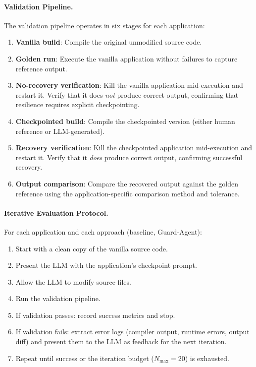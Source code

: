 \paragraph{Validation Pipeline.}

The validation pipeline operates in six stages for each application:

\begin{enumerate}
    \item \textbf{Vanilla build}: Compile the original unmodified source code.
    \item \textbf{Golden run}: Execute the vanilla application without failures to capture reference output.
    \item \textbf{No-recovery verification}: Kill the vanilla application mid-execution and restart it. Verify that it does \emph{not} produce correct output, confirming that resilience requires explicit checkpointing.
    \item \textbf{Checkpointed build}: Compile the checkpointed version (either human reference or LLM-generated).
    \item \textbf{Recovery verification}: Kill the checkpointed application mid-execution and restart it. Verify that it \emph{does} produce correct output, confirming successful recovery.
    \item \textbf{Output comparison}: Compare the recovered output against the golden reference using the application-specific comparison method and tolerance.
\end{enumerate}

\paragraph{Iterative Evaluation Protocol.}

For each application and each approach (baseline, Guard-Agent):

\begin{enumerate}
    \item Start with a clean copy of the vanilla source code.
    \item Present the LLM with the application's checkpoint prompt.
    \item Allow the LLM to modify source files.
    \item Run the validation pipeline.
    \item If validation passes: record success metrics and stop.
    \item If validation fails: extract error logs (compiler output, runtime errors, output diff) and present them to the LLM as feedback for the next iteration.
    \item Repeat until success or the iteration budget ($N_\text{max} = 20$) is exhausted.
\end{enumerate}

